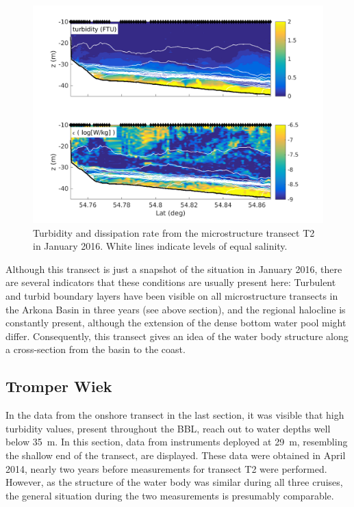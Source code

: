 \begin{figure}[ht]
\includegraphics[width=40pc]{bilder/abtrans.png}
 \caption{Turbidity and dissipation rate from the microstructure transect T2 
in January 2016. White lines indicate levels of equal salinity.}
 \label{transect}
 \end{figure}
 
 Although this transect is just a snapshot of the situation in January 
2016, there are several indicators that these conditions are usually present 
here: Turbulent and turbid boundary layers have been visible on all 
microstructure transects in the Arkona Basin in three years (see above 
section), 
and the regional halocline is constantly present, although the extension 
of the dense bottom water pool might differ. Consequently, this transect gives 
an idea of the water body structure along a cross-section from the basin to 
the coast.
  
\FloatBarrier
\subsection{Tromper Wiek}

In the data from the onshore transect in the last section, it was visible that 
high turbidity values, present throughout the BBL, reach out to water depths 
well below 35~m. In this section, data from instruments deployed at 29~m, 
resembling the shallow end of the transect, are displayed. These data were 
obtained in April 2014, nearly two years before measurements for transect T2 
were performed. However, as the structure of the water body was similar during 
all three cruises, the general situation during the two measurements is 
presumably comparable.

